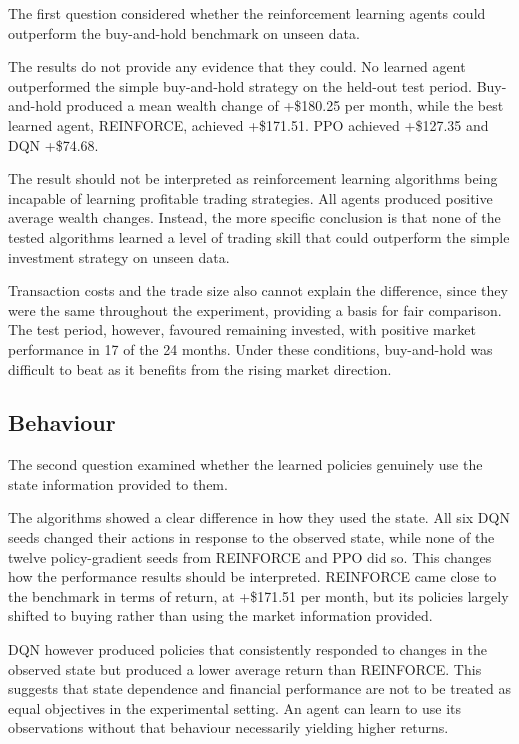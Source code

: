 The first question considered whether the reinforcement learning agents
could outperform the buy-and-hold benchmark on unseen data.

The results do not provide any evidence that they could. No learned
agent outperformed the simple buy-and-hold strategy on the held-out test
period. Buy-and-hold produced a mean wealth change of +\$180.25 per
month, while the best learned agent, REINFORCE, achieved +\$171.51. PPO
achieved +\$127.35 and DQN +\$74.68.

The result should not be interpreted as reinforcement learning
algorithms being incapable of learning profitable trading strategies.
All agents produced positive average wealth changes. Instead, the more
specific conclusion is that none of the tested algorithms learned a
level of trading skill that could outperform the simple investment
strategy on unseen data.

Transaction costs and the trade size also cannot explain the difference,
since they were the same throughout the experiment, providing a basis
for fair comparison. The test period, however, favoured remaining
invested, with positive market performance in 17 of the 24 months. Under
these conditions, buy-and-hold was difficult to beat as it benefits from
the rising market direction.

\subsection{Behaviour}

The second question examined whether the learned policies genuinely use
the state information provided to them.

The algorithms showed a clear difference in how they used the state. All
six DQN seeds changed their actions in response to the observed state,
while none of the twelve policy-gradient seeds from REINFORCE and PPO
did so. This changes how the performance results should be interpreted.
REINFORCE came close to the benchmark in terms of return, at +\$171.51
per month, but its policies largely shifted to buying rather than using
the market information provided.

DQN however produced policies that consistently responded to changes in
the observed state but produced a lower average return than REINFORCE.
This suggests that state dependence and financial performance are not to
be treated as equal objectives in the experimental setting. An agent can
learn to use its observations without that behaviour necessarily
yielding higher returns.

